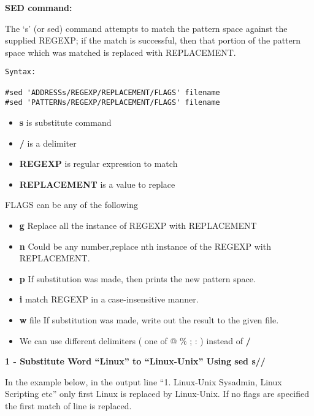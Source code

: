 \documentclass[a4paper,11pt,spanish]{article} %
\newenvironment{myscriptlisting}
{\begin{list}{}{\setlength{\leftmargin}{1em}}\item\scriptsize\bfseries}
{\end{list}}
\begin{document}
\textbf{SED command:}

The `s’ (or sed) command attempts to match the pattern space against the supplied REGEXP;
if the match is successful, then that portion of the pattern space which was 
matched is replaced with REPLACEMENT.

\begin{myscriptlisting}
 \begin{verbatim}
Syntax:

#sed 'ADDRESSs/REGEXP/REPLACEMENT/FLAGS' filename
#sed 'PATTERNs/REGEXP/REPLACEMENT/FLAGS' filename
\end{verbatim}
\end{myscriptlisting}

\begin{itemize}
 \item \textbf{s} is substitute command
 \item \textbf{/} is a delimiter
 \item \textbf{REGEXP} is regular expression to match
 \item \textbf{REPLACEMENT} is a value to replace
\end{itemize}

FLAGS can be any of the following

\begin{itemize}
 \item \textbf{g} Replace all the instance of REGEXP with REPLACEMENT
 \item \textbf{n} Could be any number,replace nth instance of the REGEXP with REPLACEMENT.
 \item \textbf{p} If substitution was made, then prints the new pattern space.
 \item \textbf{i} match REGEXP in a case-insensitive manner.
 \item \textbf{w} file If substitution was made, write out the result to the given file.
 \item We can use different delimiters ( one of @ \% ; : ) instead of \textbf{/}
\end{itemize}


\textbf{1 - Substitute Word “Linux” to “Linux-Unix” Using sed s//}

In the example below, in the output line “1. Linux-Unix Sysadmin, Linux
Scripting etc” only first Linux is replaced by Linux-Unix. If no flags are 
specified the first match of line is replaced.
\end{document}
